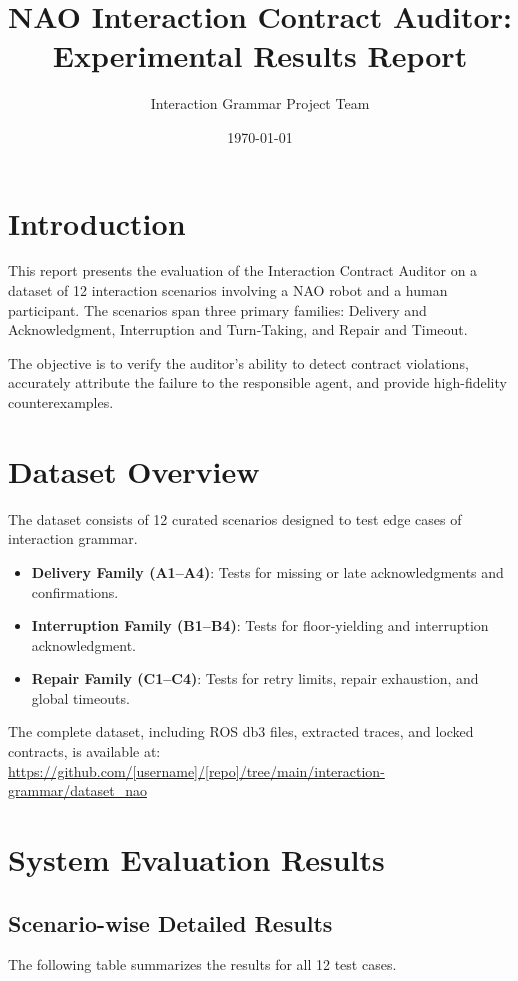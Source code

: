 \documentclass[10pt, letterpaper]{article}
\title{NAO Interaction Contract Auditor: Experimental Results Report}
\author{Interaction Grammar Project Team}
\date{\today}
\begin{document}
\maketitle

\section{Introduction}
This report presents the evaluation of the Interaction Contract Auditor on a dataset of 12 interaction scenarios involving a NAO robot and a human participant. The scenarios span three primary families: Delivery and Acknowledgment, Interruption and Turn-Taking, and Repair and Timeout.

The objective is to verify the auditor's ability to detect contract violations, accurately attribute the failure to the responsible agent, and provide high-fidelity counterexamples.

\section{Dataset Overview}
The dataset consists of 12 curated scenarios designed to test edge cases of interaction grammar.
\begin{itemize}
    \item \textbf{Delivery Family (A1--A4)}: Tests for missing or late acknowledgments and confirmations.
    \item \textbf{Interruption Family (B1--B4)}: Tests for floor-yielding and interruption acknowledgment.
    \item \textbf{Repair Family (C1--C4)}: Tests for retry limits, repair exhaustion, and global timeouts.
\end{itemize}

The complete dataset, including ROS db3 files, extracted traces, and locked contracts, is available at: \\
\url{https://github.com/[username]/[repo]/tree/main/interaction-grammar/dataset_nao}

\section{System Evaluation Results}

\subsection{Scenario-wise Detailed Results}
The following table summarizes the results for all 12 test cases.
\end{document}
